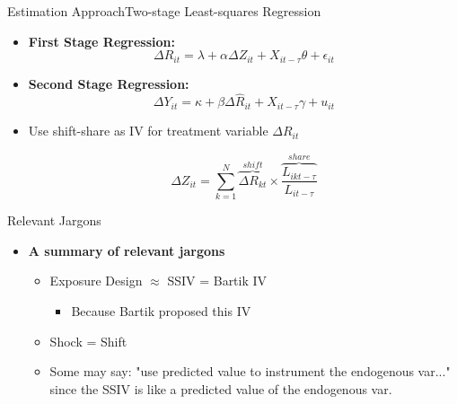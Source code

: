 \documentclass[dvipsnames,hyperref={pdfpagelabels=false}]{beamer}
\begin{document}
	
	\begin{frame}{Estimation Approach}{Two-stage Least-squares Regression }
		\begin{itemize}
			\item \textbf{First Stage Regression:}
			\begin{equation*}
			\Delta R_{it} = \lambda + \alpha \Delta Z_{it} + X_{it-\tau} \theta +  \epsilon_{it}
		\end{equation*}
			\item \textbf{Second Stage Regression:}
			\begin{equation*}
			\Delta Y_{it} =  \kappa + \beta \Delta \hat{R}_{it} + X_{it-\tau} \gamma + u_{it}
		\end{equation*}
	
	\item Use shift-share as IV for treatment variable $\Delta R_{it}$
	
	\[ \Delta Z_{it}=\sum_{k=1}^{N} \overbrace{\Delta R_{kt}}^{shift} \times \overbrace{\frac{L_{ikt-\tau}}{L_{it-\tau}}}^{share} \]
		\end{itemize}
	\end{frame}





\begin{frame}{Relevant Jargons}
	\begin{itemize}
		\item \textbf{A summary of relevant jargons}
		\vspace{0.2cm}
		\begin{itemize}
			\item Exposure Design $\approx$ SSIV = Bartik IV 
					\vspace{0.2cm}
					\begin{itemize}
			\item Because Bartik proposed this IV
			
					\end{itemize}
			\vspace{0.2cm}
			\item Shock = Shift
			\vspace{0.2cm}
			\item Some may say: "use predicted value to instrument the endogenous var..." since the SSIV is like a predicted value of the endogenous var.
		\end{itemize}
	\end{itemize}
\end{frame}
\end{document}

